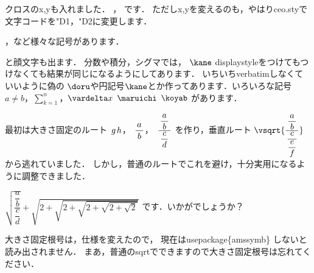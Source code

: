 \documentclass [10pt,fleqn,b5j]{jsarticlek}
\begin{document}
クロスのx,yも入れました．
， です．
ただしx,yを変えるのも，やはりceo.styで文字コードを"D1，"D2に変更します．

，など様々な記号があります．

と顔文字も出ます．
分数や積分，シグマでは，
$\kane$ displaystyleをつけてもつけなくても結果が同じになるようにしてあります．
いちいちverbatimしなくていいように偽の
$\doru$や円記号$\kane$とか作ってあります．いろいろな記号
$a \neq b$，$\sum_{k=1}^{n}$，$\vardelta x$ $\maruichi$ $\koyab$
があります．

最初は大きさ固定のルート
$\sqrtb{g}\sqrtb{h}$，
$\sqrtd{\dfrac{a}{b}}$，
$\sqrti{\dfrac{\dfrac{a}{b}}{\dfrac{c}{d}}}$
を作り，垂直ルート
$\vsqrt{\dfrac{\dfrac{a}{b}}{\dfrac{c}{\dfrac{e}{f}}}}$
から逃れていました．
しかし，普通のルートでこれを避け，十分実用になるように調整できました．

$\sqrt{\dfrac{\dfrac{a}{b}}{\dfrac{c}{d}}}+\sqrt{2+\sqrt{2+\sqrt{2+\sqrt{2+\sqrt{2}}}}}$
です．いかがでしょうか？

大きさ固定根号は，仕様を変えたので，
現在はusepackage\{amssymb\} しないと読み出されません．
まあ，普通のsqrtでできますので大きさ固定根号は忘れてください．
\end{document}

